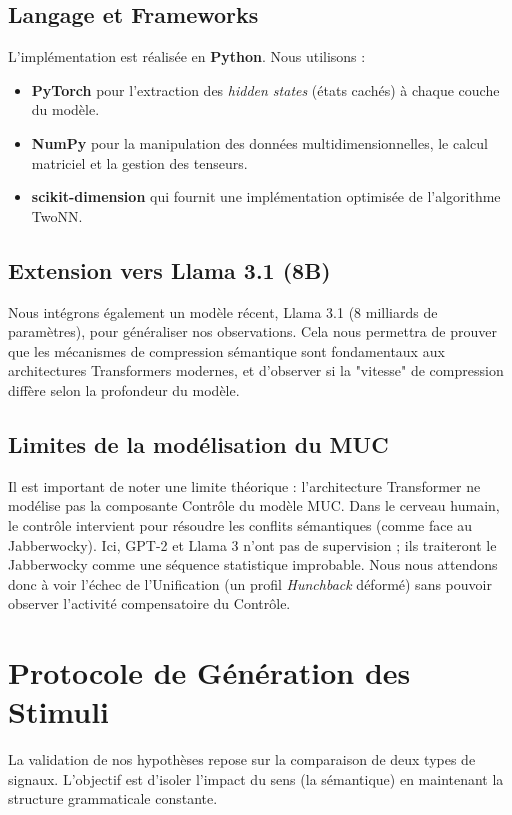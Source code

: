 \subsection{Langage et Frameworks}
L’implémentation est réalisée en \textbf{Python}. Nous utilisons :
\begin{itemize}
    \item \textbf{PyTorch} pour l’extraction des \textit{hidden states} (états cachés) à chaque couche du modèle.
    \item \textbf{NumPy} pour la manipulation des données multidimensionnelles, le calcul matriciel et la gestion des tenseurs.
    \item \textbf{scikit-dimension} qui fournit une implémentation optimisée de l'algorithme TwoNN.
\end{itemize}

\subsection{Extension vers Llama 3.1 (8B)}
Nous intégrons également un modèle récent, Llama 3.1 (8 milliards de paramètres), pour généraliser nos observations. Cela nous permettra de prouver que les mécanismes de compression sémantique sont fondamentaux aux architectures Transformers modernes, et d'observer si la "vitesse" de compression diffère selon la profondeur du modèle.

\subsection{Limites de la modélisation du MUC}
Il est important de noter une limite théorique : l’architecture Transformer ne modélise pas la composante \og Contrôle \fg{} du modèle MUC. Dans le cerveau humain, le contrôle intervient pour résoudre les conflits sémantiques (comme face au Jabberwocky). Ici, GPT-2 et Llama 3 n’ont pas de supervision ; ils traiteront le Jabberwocky comme une séquence statistique improbable. Nous nous attendons donc à voir l’échec de l’Unification (un profil \textit{Hunchback} déformé) sans pouvoir observer l’activité compensatoire du Contrôle.

\section{Protocole de Génération des Stimuli}

La validation de nos hypothèses repose sur la comparaison de deux types de signaux. L’objectif est d’isoler l’impact du sens (la sémantique) en maintenant la structure grammaticale constante.

